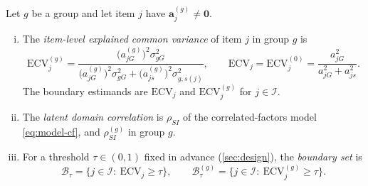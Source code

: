 \begin{definition}\label{def:boundary}
Let $g$ be a group and let item $j$ have $\bm a_j^{(g)}\neq\bm0$.
\begin{enumerate}[(i)]
  \item The \emph{item-level explained common variance} of item $j$ in group $g$ is
  \begin{equation}\label{eq:model-ecv}
    \mathrm{ECV}^{(g)}_j=\frac{\bigl(a^{(g)}_{jG}\bigr)^2\sigma^2_{gG}}{\bigl(a^{(g)}_{jG}\bigr)^2\sigma^2_{gG}+\bigl(a^{(g)}_{js}\bigr)^2\sigma^2_{g,s(j)}},
    \qquad
    \mathrm{ECV}_j=\mathrm{ECV}^{(0)}_j=\frac{a_{jG}^2}{a_{jG}^2+a_{js}^2}.
  \end{equation}
  The boundary estimands are $\mathrm{ECV}_j$ and $\mathrm{ECV}^{(g)}_j$ for $j\in\mathcal I$.
  \item The \emph{latent domain correlation} is $\rho_{SI}$ of the correlated-factors model \eqref{eq:model-cf}, and $\rho^{(g)}_{SI}$ in group $g$.
  \item For a threshold $\tau\in(0,1)$ fixed in advance (\cref{sec:design}), the \emph{boundary set} is
  \begin{equation}\label{eq:model-bset}
    \mathcal B_\tau=\{j\in\mathcal I:\ \mathrm{ECV}_j\ge\tau\},\qquad
    \mathcal B^{(g)}_\tau=\{j\in\mathcal I:\ \mathrm{ECV}^{(g)}_j\ge\tau\}.
  \end{equation}
\end{enumerate}
\end{definition}


